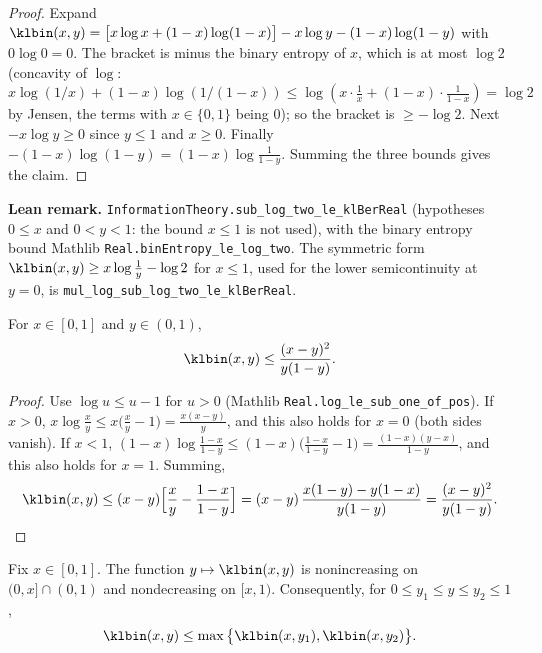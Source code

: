\begin{proof}
\leanok
Expand $\klbin(x, y) = \big[x\log x + (1-x)\log(1-x)\big] - x\log y - (1 - x)\log(1 - y)$ with
$0 \log 0 = 0$. The bracket is minus the binary entropy of $x$, which is at most $\log 2$
(concavity of $\log$: $x\log(1/x) + (1-x)\log(1/(1-x)) \le \log(x \cdot \tfrac1x + (1-x)\cdot\tfrac1{1-x}) = \log 2$
by Jensen, the terms with $x \in \{0,1\}$ being $0$); so the bracket is $\ge -\log 2$. Next
$-x\log y \ge 0$ since $y \le 1$ and $x \ge 0$. Finally
$-(1-x)\log(1-y) = (1-x)\log\frac{1}{1-y}$. Summing the three bounds gives the claim.
\end{proof}

\textbf{Lean remark.} \texttt{InformationTheory.sub\_log\_two\_le\_klBerReal} (hypotheses
$0 \le x$ and $0 < y < 1$: the bound $x \le 1$ is not used), with the binary entropy bound Mathlib
\texttt{Real.binEntropy\_le\_log\_two}. The symmetric form
$\klbin(x, y) \ge x\log\frac1y - \log 2$ for $x \le 1$, used for the lower semicontinuity at
$y = 0$, is \texttt{mul\_log\_sub\_log\_two\_le\_klBerReal}.

\begin{lemma}\label{lem:klbin_upper}
\leanok
{}
For $x \in [0, 1]$ and $y \in (0, 1)$,
\[
  \klbin(x, y) \le \frac{(x - y)^2}{y(1 - y)} .
\]
\end{lemma}

\begin{proof}
\leanok
Use $\log u \le u - 1$ for $u > 0$ (Mathlib \texttt{Real.log\_le\_sub\_one\_of\_pos}). If
$x > 0$, $x\log\frac{x}{y} \le x\big(\frac{x}{y} - 1\big) = \frac{x(x - y)}{y}$, and this also
holds for $x = 0$ (both sides vanish). If $x < 1$,
$(1-x)\log\frac{1-x}{1-y} \le (1-x)\big(\frac{1-x}{1-y} - 1\big) = \frac{(1-x)(y - x)}{1-y}$, and
this also holds for $x = 1$. Summing,
\[
  \klbin(x, y) \le (x - y)\Big[\frac{x}{y} - \frac{1 - x}{1 - y}\Big]
  = (x - y)\,\frac{x(1-y) - y(1-x)}{y(1-y)} = \frac{(x - y)^2}{y(1-y)} .
\]
\end{proof}

\begin{lemma}\label{lem:pinfo_klbin_convex_right}
\leanok
{}
Fix $x \in [0, 1]$. The function $y \mapsto \klbin(x, y)$ is nonincreasing on $(0, x] \cap (0,1)$
and nondecreasing on $[x, 1)$. Consequently, for $0 \le y_1 \le y \le y_2 \le 1$,
\[
  \klbin(x, y) \le \max\big\{\klbin(x, y_1), \klbin(x, y_2)\big\}.
\]
\end{lemma}

